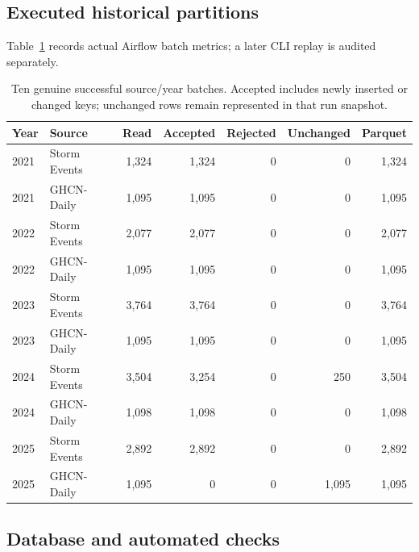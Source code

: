 \subsection{Executed historical partitions}

Table~\ref{tab:runs} records actual Airflow batch metrics; a later CLI replay is audited separately.

\begin{table}[htbp]\centering\small

\begin{tabular}{llrrrrr}\toprule Year & Source & Read & Accepted & Rejected & Unchanged & Parquet\\\midrule

2021 & Storm Events & 1,324 & 1,324 & 0 & 0 & 1,324\\

2021 & GHCN-Daily & 1,095 & 1,095 & 0 & 0 & 1,095\\

2022 & Storm Events & 2,077 & 2,077 & 0 & 0 & 2,077\\

2022 & GHCN-Daily & 1,095 & 1,095 & 0 & 0 & 1,095\\

2023 & Storm Events & 3,764 & 3,764 & 0 & 0 & 3,764\\

2023 & GHCN-Daily & 1,095 & 1,095 & 0 & 0 & 1,095\\

2024 & Storm Events & 3,504 & 3,254 & 0 & 250 & 3,504\\

2024 & GHCN-Daily & 1,098 & 1,098 & 0 & 0 & 1,098\\

2025 & Storm Events & 2,892 & 2,892 & 0 & 0 & 2,892\\

2025 & GHCN-Daily & 1,095 & 0 & 0 & 1,095 & 1,095\\

\bottomrule\end{tabular}

\caption{Ten genuine successful source/year batches. Accepted includes newly inserted or changed keys; unchanged rows remain represented in that run snapshot.}\label{tab:runs}\end{table}

\subsection{Database and automated checks}

